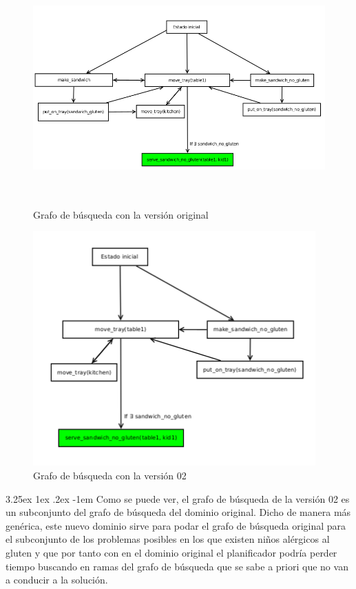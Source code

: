 \documentclass{article}
\makeatletter
\renewcommand\paragraph{\@startsection{paragraph}{5}{\z@}%
      {3.25ex \@plus1ex \@minus.2ex}%
      {-1em}%
      {\normalfont\normalsize\bfseries}}
\makeatother
\begin{document}
    \begin{figure}[H]
        \centering
        \includegraphics[width=\textwidth, height=9cm]{domain-02-1}
        \caption{Grafo de búsqueda con la versión original}
    \end{figure}
    
    \begin{figure}[H]
        \centering
        \includegraphics[width=\textwidth, height=9cm]{imgTr}
        \caption{Grafo de búsqueda con la versión 02}
    \end{figure}
    
    
    \paragraph{}
    Como se puede ver, el grafo de búsqueda de la versión 02 es un subconjunto del grafo de búsqueda del dominio original. Dicho de manera más genérica, este nuevo dominio sirve para podar el grafo de búsqueda original para el subconjunto de los problemas posibles en los que existen niños alérgicos al gluten y que por tanto con en el dominio original el planificador podría perder tiempo buscando en ramas del grafo de búsqueda que se sabe a priori que no van a conducir a la solución.
    
\end{document}
